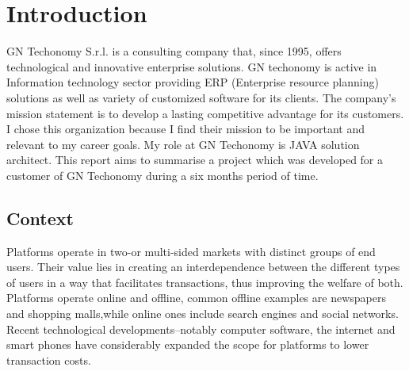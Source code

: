 \chapter{Introduction}
\label{chapter1}
\thispagestyle{plain}
GN Techonomy S.r.l. is a consulting company that, since 1995, offers technological and innovative enterprise solutions. GN techonomy is active in Information technology sector providing ERP (Enterprise resource planning) solutions as well as variety of customized software for its clients. The company’s mission statement is to develop a lasting competitive advantage for its customers. I chose this organization because I find their mission to be important and relevant to my career goals.
My role at GN  Techonomy is JAVA solution architect. This report aims to summarise a project which was developed for a customer of GN Techonomy during a six months period of time.

\section{Context}\label{sec:context}
Platforms operate in two-or multi-sided markets with distinct groups of end users. \cite{article_two_sided_platform} Their value lies in creating an interdependence between the different types of users in a way that facilitates transactions, thus improving the welfare of both. \cite{Lamadrid_2015}
Platforms operate online and offline, common offline examples are newspapers and shopping malls,while online ones include search engines and social networks. \cite{Rochet2005TheRC} Recent technological developments–notably computer software, the internet and smart phones have considerably expanded the scope for platforms to lower transaction costs. \cite{Munger2015}

